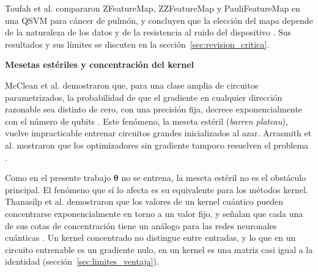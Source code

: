 Toufah et al. compararon ZFeatureMap, ZZFeatureMap y PauliFeatureMap en una QSVM para cáncer de pulmón, y concluyen que la elección del mapa depende de la naturaleza de los datos y de la resistencia al ruido del dispositivo \cite{ElHafidi2025}. Sus resultados y sus límites se discuten en la sección~\ref{sec:revision_critica}.

\textbf{Mesetas estériles y concentración del kernel}

McClean et al. demostraron que, para una clase amplia de circuitos parametrizados, la probabilidad de que el gradiente en cualquier dirección razonable sea distinto de cero, con una precisión fija, decrece exponencialmente con el número de qubits \cite{McClean2018Barren}. Este fenómeno, la meseta estéril (\textit{barren plateau}), vuelve impracticable entrenar circuitos grandes inicializados al azar.
Arrasmith et al. mostraron que los optimizadores sin gradiente tampoco resuelven el problema \cite{Arrasmith2021}.

Como en el presente trabajo $\boldsymbol{\theta}$ no se entrena, la meseta estéril no es el obstáculo principal. El fenómeno que sí lo afecta es su equivalente para los métodos kernel.
Thanasilp et al. demostraron que los valores de un kernel cuántico pueden concentrarse exponencialmente en torno a un valor fijo, y señalan que cada una de sus cotas de concentración tiene un análogo para las redes neuronales cuánticas \cite{Thanasilp2024}. Un kernel concentrado no distingue entre entradas, y lo que en un circuito entrenable es un gradiente nulo, en un kernel es una matriz casi igual a la identidad (sección~\ref{sec:limites_ventaja}).
